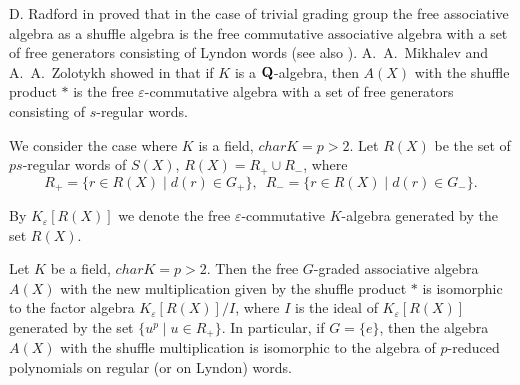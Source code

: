 D. Radford in \cite{Radford} proved that in the case of trivial grading group
the free associative algebra as a shuffle algebra is the free commutative
associative algebra with a set of free generators consisting of Lyndon words
(see also \cite{Reut}).
A.~A.~Mikhalev and A.~A.~Zolotykh showed in \cite{MiZo1,MiZo2}
that if $K$ is a ${\bf Q}$-algebra, then $A(X)$ with the shuffle product
$*$ is the free $\varepsilon$-commutative algebra with a set of free
generators consisting of $s$-regular words.

We consider the case where $K$ is a field, $char K = p>2$.
Let $R(X)$ be the set of $ps$-regular words of $S(X)$, $R(X)=R_+ \cup R_-$,
where
$$R_+=\{ r\in R(X) \mid d(r)\in G_+ \}, \, \, \,
R_-=\{ r\in R(X) \mid d(r)\in G_- \}.$$

By $K_{\varepsilon}[R(X)]$ we denote the free $\varepsilon$-commutative
$K$-algebra generated by the set $R(X)$.

\begin{theorem}
Let
$K$ be a field, $char K = p>2$. Then the free $G$-graded associative
algebra $A(X)$ with the new
multiplication given by the shuffle product $*$ is isomorphic to the
factor algebra $K_{\varepsilon}[R(X)]/I$, where
$I$ is the ideal of $K_{\varepsilon}[R(X)]$ generated by the set
$\{ u^p \mid u\in R_+ \}$.
In particular, if $G=\{ e \}$, then the algebra
$A(X)$ with the shuffle multiplication is isomorphic to the algebra of
$p$-reduced polynomials on regular (or on Lyndon) words.
\end{theorem}


